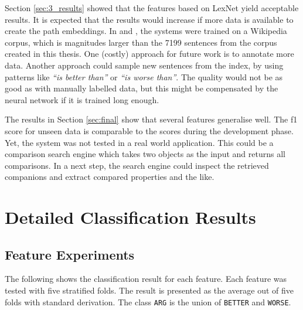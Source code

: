Section \ref{sec:3_results} showed that the features based on LexNet yield acceptable results. It is expected that the results would increase if more data is available to create the path embeddings. In \cite{DBLP:conf/acl/ShwartzGD16} and \cite{DBLP:journals/corr/ShwartzD16}, the systems were trained on a Wikipedia corpus, which is magnitudes larger than the 7199 sentences from the corpus created in this thesis. One (costly) approach for future work is to annotate more data. Another approach could sample new sentences from the index, by using patterns like \emph{\enquote{is better than}} or \emph{\enquote{is worse than}}. The quality would not be as good as with manually labelled data, but this might be compensated by the neural network if it is trained long enough.

The results in Section \ref{sec:final} show that several features generalise well. The f1 score for unseen data is comparable to the scores during the development phase. Yet, the system was not tested in a real world application. This could be a comparison search engine which takes two objects as the input and returns all comparisons. In a next step, the search engine could inspect the retrieved companions and extract compared properties and the like.

\appendix

	\chapter{Detailed Classification Results}
\section{Feature Experiments}
	\setcounter{section}{1}
	The following shows the classification result for each feature. Each feature was tested with five stratified folds. The result is presented as the average out of five folds with standard derivation. The class \texttt{ARG} is the union of \texttt{BETTER} and \texttt{WORSE}.
	


